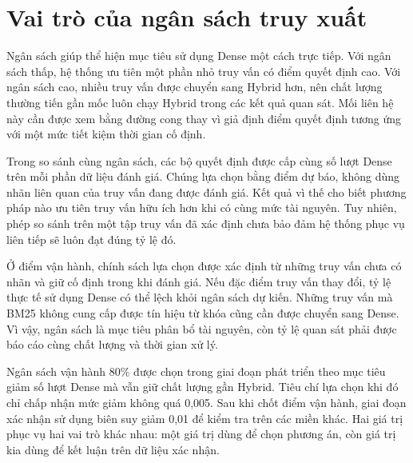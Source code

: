 \section{Vai trò của ngân sách truy xuất}
Ngân sách giúp thể hiện mục tiêu sử dụng Dense một cách trực tiếp. Với ngân sách thấp, hệ thống ưu tiên một phần nhỏ truy vấn có điểm quyết định cao. Với ngân sách cao, nhiều truy vấn được chuyển sang Hybrid hơn, nên chất lượng thường tiến gần mốc luôn chạy Hybrid trong các kết quả quan sát. Mối liên hệ này cần được xem bằng đường cong thay vì giả định điểm quyết định tương ứng với một mức tiết kiệm thời gian cố định.

Trong so sánh cùng ngân sách, các bộ quyết định được cấp cùng số lượt Dense trên mỗi phần dữ liệu đánh giá. Chúng lựa chọn bằng điểm dự báo, không dùng nhãn liên quan của truy vấn đang được đánh giá. Kết quả vì thế cho biết phương pháp nào ưu tiên truy vấn hữu ích hơn khi có cùng mức tài nguyên. Tuy nhiên, phép so sánh trên một tập truy vấn đã xác định chưa bảo đảm hệ thống phục vụ liên tiếp sẽ luôn đạt đúng tỷ lệ đó.

Ở điểm vận hành, chính sách lựa chọn được xác định từ những truy vấn chưa có nhãn và giữ cố định trong khi đánh giá. Nếu đặc điểm truy vấn thay đổi, tỷ lệ thực tế sử dụng Dense có thể lệch khỏi ngân sách dự kiến. Những truy vấn mà BM25 không cung cấp được tín hiệu từ khóa cũng cần được chuyển sang Dense. Vì vậy, ngân sách là mục tiêu phân bổ tài nguyên, còn tỷ lệ quan sát phải được báo cáo cùng chất lượng và thời gian xử lý.

Ngân sách vận hành 80\% được chọn trong giai đoạn phát triển theo mục tiêu giảm số lượt Dense mà vẫn giữ chất lượng gần Hybrid. Tiêu chí lựa chọn khi đó chỉ chấp nhận mức giảm không quá 0,005. Sau khi chốt điểm vận hành, giai đoạn xác nhận sử dụng biên suy giảm 0,01 để kiểm tra trên các miền khác. Hai giá trị phục vụ hai vai trò khác nhau: một giá trị dùng để chọn phương án, còn giá trị kia dùng để kết luận trên dữ liệu xác nhận.


